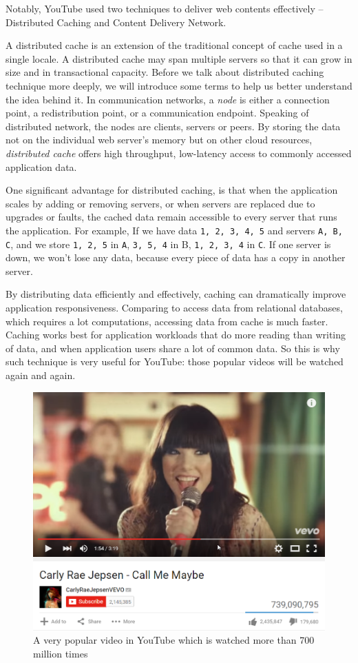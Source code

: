 
Notably, YouTube used two techniques to deliver web contents effectively -- Distributed Caching and Content Delivery Network.

A distributed cache is an extension of the traditional concept of cache used in a single locale. A distributed cache may span multiple servers so that it can grow in size and in transactional capacity\cite{wiki:dcache}. Before we talk about distributed caching technique more deeply, we will introduce some terms to help us better understand the idea behind it. In communication networks, a \textit{node} is either a connection point, a redistribution point, or a communication endpoint. Speaking of distributed network, the nodes are clients, servers or peers. By storing the data not on the individual web server's memory but on other cloud resources, \textit{distributed cache} offers high throughput, low-latency access to commonly accessed application data.

One significant advantage for distributed caching, is that when the application scales by adding or removing servers, or when servers are replaced due to upgrades or faults, the cached data remain accessible to every server that runs the application. For example, If we have data \texttt{1, 2, 3, 4, 5} and servers \texttt{A, B, C}, and we store \texttt{1, 2, 5} in \texttt{A}, \texttt{3, 5, 4} in B, \texttt{1, 2, 3, 4} in \texttt{C}. If one server is down, we won't lose any data, because every piece of data has a copy in another server.


By distributing data efficiently and effectively, caching can dramatically improve application responsiveness. Comparing to access data from relational databases, which requires a lot computations, accessing data from cache is much faster. Caching works best for application workloads that do more reading than writing of data, and when application users share a lot of common data. So this is why such technique is very useful for YouTube: those popular videos will be watched again and again.

\begin{figure}[H]
	\centering
	\includegraphics[width=0.7\linewidth]{CallMeMaybe.png}
	\caption{A very popular video in YouTube which is watched more than 700 million times}
\end{figure}

